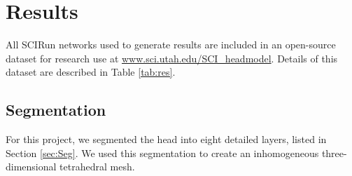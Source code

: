 %

\section{Results}
\label{sec:results}

All SCIRun networks used to generate results are included in an open-source dataset for research use at \url{www.sci.utah.edu/SCI_headmodel}. Details of this dataset are described in Table \ref{tab:res}.


\subsection{Segmentation}

For this project, we segmented the head into eight detailed layers, listed in Section \ref{sec:Seg}. We used this segmentation to create an inhomogeneous three-dimensional tetrahedral mesh.

